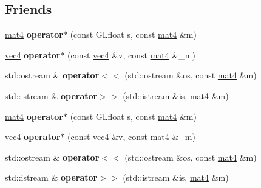 \subsection*{\-Friends}
\begin{DoxyCompactItemize}
\item 
\hypertarget{class_angel_1_1mat4_aee74ba4512e3c59e8ed73764e4396d59}{\hyperlink{class_angel_1_1mat4}{mat4} {\bfseries operator$\ast$} (const \-G\-Lfloat s, const \hyperlink{class_angel_1_1mat4}{mat4} \&m)}\label{class_angel_1_1mat4_aee74ba4512e3c59e8ed73764e4396d59}

\item 
\hypertarget{class_angel_1_1mat4_a43eac2e676368c54279c3babf511fa6b}{\hyperlink{struct_angel_1_1vec4}{vec4} {\bfseries operator$\ast$} (const \hyperlink{struct_angel_1_1vec4}{vec4} \&v, const \hyperlink{class_angel_1_1mat4}{mat4} \&\-\_\-m)}\label{class_angel_1_1mat4_a43eac2e676368c54279c3babf511fa6b}

\item 
\hypertarget{class_angel_1_1mat4_ac079e857a3c74a1b974e4f4619e16adf}{std\-::ostream \& {\bfseries operator$<$$<$} (std\-::ostream \&os, const \hyperlink{class_angel_1_1mat4}{mat4} \&m)}\label{class_angel_1_1mat4_ac079e857a3c74a1b974e4f4619e16adf}

\item 
\hypertarget{class_angel_1_1mat4_a897b946d3a30dbddc811d486bfa4b61a}{std\-::istream \& {\bfseries operator$>$$>$} (std\-::istream \&is, \hyperlink{class_angel_1_1mat4}{mat4} \&m)}\label{class_angel_1_1mat4_a897b946d3a30dbddc811d486bfa4b61a}

\item 
\hypertarget{class_angel_1_1mat4_aee74ba4512e3c59e8ed73764e4396d59}{\hyperlink{class_angel_1_1mat4}{mat4} {\bfseries operator$\ast$} (const \-G\-Lfloat s, const \hyperlink{class_angel_1_1mat4}{mat4} \&m)}\label{class_angel_1_1mat4_aee74ba4512e3c59e8ed73764e4396d59}

\item 
\hypertarget{class_angel_1_1mat4_a43eac2e676368c54279c3babf511fa6b}{\hyperlink{struct_angel_1_1vec4}{vec4} {\bfseries operator$\ast$} (const \hyperlink{struct_angel_1_1vec4}{vec4} \&v, const \hyperlink{class_angel_1_1mat4}{mat4} \&\-\_\-m)}\label{class_angel_1_1mat4_a43eac2e676368c54279c3babf511fa6b}

\item 
\hypertarget{class_angel_1_1mat4_ac079e857a3c74a1b974e4f4619e16adf}{std\-::ostream \& {\bfseries operator$<$$<$} (std\-::ostream \&os, const \hyperlink{class_angel_1_1mat4}{mat4} \&m)}\label{class_angel_1_1mat4_ac079e857a3c74a1b974e4f4619e16adf}

\item 
\hypertarget{class_angel_1_1mat4_a897b946d3a30dbddc811d486bfa4b61a}{std\-::istream \& {\bfseries operator$>$$>$} (std\-::istream \&is, \hyperlink{class_angel_1_1mat4}{mat4} \&m)}\label{class_angel_1_1mat4_a897b946d3a30dbddc811d486bfa4b61a}

\end{DoxyCompactItemize}


